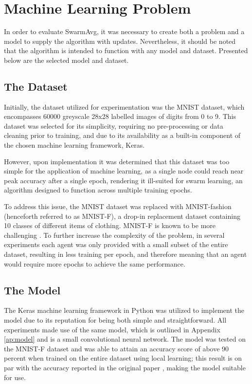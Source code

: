 \section{Machine Learning Problem}
In order to evaluate SwarmAvg, it was necessary to create both a problem and a model to supply the algorithm with updates. Nevertheless, it should be noted that the algorithm is intended to function with any model and dataset. Presented below are the selected model and dataset.

\subsection{The Dataset}
Initially, the dataset utilized for experimentation was the MNIST dataset, which encompasses 60000 greyscale 28x28 labelled images of digits from 0 to 9. This dataset was selected for its simplicity, requiring no pre-processing or data cleaning prior to training, and due to its availability as a built-in component of the chosen machine learning framework, Keras.

However, upon implementation it was determined that this dataset was too simple for the application of machine learning, as a single node could reach near peak accuracy after a single epoch, rendering it ill-suited for swarm learning, an algorithm designed to function across multiple training epochs.

To address this issue, the MNIST dataset was replaced with MNIST-fashion (henceforth referred to as MNIST-F), a drop-in replacement dataset containing 10 classes of different items of clothing. MNIST-F is known to be more challenging \cite{xiao2017fashionmnist}. To further increase the complexity of the problem, in several experiments each agent was only provided with a small subset of the entire dataset, resulting in less training per epoch, and therefore meaning that an agent would require more epochs to achieve the same performance.

\subsection{The Model}
The Keras machine learning framework in Python was utilized to implement the model due to its reputation for being both simple and straightforward. All experiments made use of the same model, which is outlined in Appendix \ref{ap:model} and is a small convolutional neural network. The model was tested on the MNIST-F dataset and was able to attain an accuracy score of above 90 percent when trained on the entire dataset using local learning; this result is on par with the accuracy reported in the original paper \cite{xiao2017fashionmnist}, making the model suitable for use.


